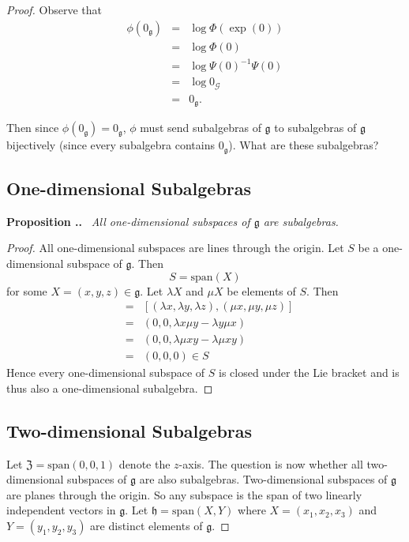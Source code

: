 \documentclass[honours]{UNSWthesis}
\newcommand{\G}{\mathcal{G}}
\newcommand{\g}{\mathfrak{g}}
\newcommand{\1}{\mathbf{e}_{1}}
\newcommand{\2}{\mathbf{e}_{3}}
\newcommand{\3}{\mathbf{e}_{3}}
\newcounter{Item}[section]
\newenvironment{Proposition}{\medskip
                            \refstepcounter{Item}
                            \noindent
                           {\bf Proposition \thesection.\theItem.}\ %
                            \begingroup \sl}
                           {\endgroup\medskip}
\begin{document}
\begin{proof}
Observe that 
\begin{eqnarray*}
\phi(0_{\g})&=&\log \Phi (\exp(0)) \\
&=& \log \Phi(0) \\
&=& \log \Psi(0)^{-1}\Psi(0) \\
&=& \log 0_{\G} \\
&=& 0_{\g}.
\end{eqnarray*}

Then since $\phi(0_{\g})=0_{\g}$, $\phi$ must send subalgebras of $\g$ to subalgebras of $\g$ bijectively (since every subalgebra contains $0_{\g}$). What are these subalgebras?


\subsection{One-dimensional Subalgebras}
\begin{Proposition}
All one-dimensional subspaces of $\g$ are subalgebras.
\end{Proposition}

\begin{proof}
All one-dimensional subspaces are lines through the origin. Let $S$ be a one-dimensional subspace of $\g$. Then 
\[
S= \text{span}(X)
\]
for some $X=(x,y,z) \in \g$. Let $\lambda X$ and $\mu X$ be elements of $S$. Then 
\begin{eqnarray*}
[\lambda X,\mu X] &=& [(\lambda x, \lambda y, \lambda z), (\mu x, \mu y, \mu z)] \\
&=& (0,0, \lambda x \mu y - \lambda y \mu x) \\
&=& (0,0, \lambda  \mu xy - \lambda \mu xy) \\
&=& (0,0,0) \in S
\end{eqnarray*}
Hence every one-dimensional subspace of $S$ is closed under the Lie bracket and is thus also a one-dimensional subalgebra. 
\end{proof}

\subsection{Two-dimensional Subalgebras}
Let $\mathfrak{Z}=\text{span}(0,0,1)$ denote the $z$-axis.
The question is now whether all two-dimensional subspaces of $\g$ are also subalgebras. Two-dimensional subspaces of $\g$ are planes through the origin. So any subspace is the span of two linearly independent vectors in $\g$.
Let $\mathfrak{h}= \text{span}(X ,Y)$ where $X=(x_{1},x_{2},x_{3})$ and $Y=(y_{1},y_{2},y_{3})$ are distinct elements of $\g$.


\end{proof}
\end{document}
